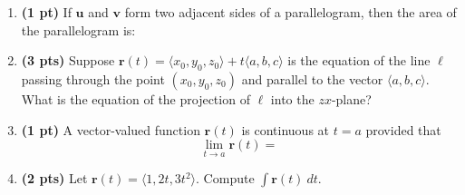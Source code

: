 \documentclass[]{article}
\newcommand{\vect}[1]{\mathbf{#1}}
\begin{document}
\begin{enumerate}
\vspace{12pc}


\item %
{\bf (1 pt)} If $\vect u$ and $\vect v$ form two adjacent sides of a parallelogram, then the area of the parallelogram is:

\vspace{3pc}


\item %
{\bf (3 pts)} Suppose 
$%
\vect r(t)=\langle x_0,y_0,z_0\rangle +t\langle a,b,c\rangle
$ %
is the equation of the line $\ell$ passing through the point $(x_0,y_0,z_0)$ and parallel to the vector $\langle a,b,c\rangle$.  What is the equation of the projection of $\ell$ into the %
$zx$-plane? %

\vspace{12pc}

\item %
{\bf (1 pt)} A vector-valued function $\vect r(t)$ is continuous at $t=a$ provided that 
\[
\lim_{t\to a}\vect r(t)=
\]

\vspace{1pc}


\item %
{\bf (2 pts)} Let $\vect r(t)=%
\langle 1,2t,3t^2\rangle$. %
Compute $\int \vect r(t)\ dt$. 

\end{enumerate}
\end{document}
